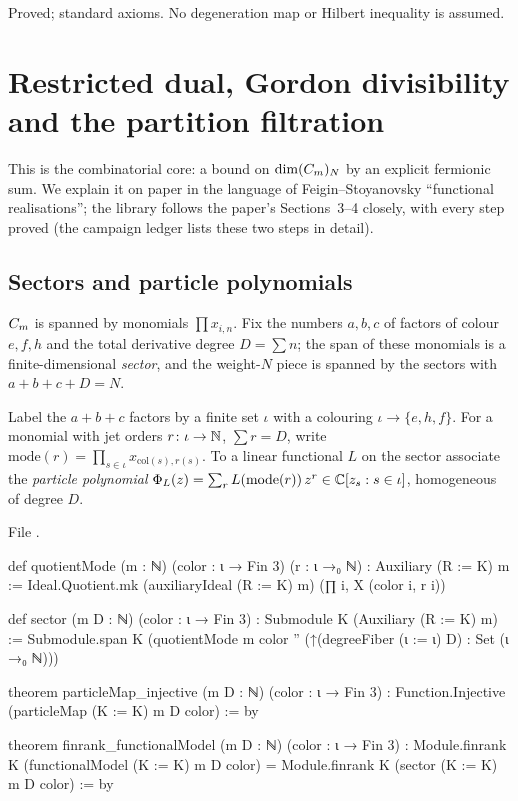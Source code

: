 \begin{status}
Proved; standard axioms. No degeneration map or Hilbert inequality is assumed.
\end{status}

\section{Restricted dual, Gordon divisibility and the partition filtration}\label{l20:sec:m23}

This is the combinatorial core: a bound on $\dim(C_m)_N$ by an explicit fermionic sum. We explain it on
paper in the language of Feigin--Stoyanovsky ``functional realisations''; the library follows the paper's
Sections~3--4 closely, with every step proved (the campaign ledger lists these two steps in detail).

\subsection{Sectors and particle polynomials}

$C_m$ is spanned by monomials $\prod x_{i,n}$. Fix the numbers $a,b,c$ of factors of colour $e,f,h$ and the
total derivative degree $D=\sum n$; the span of these monomials is a finite-dimensional \emph{sector}, and the
weight-$N$ piece is spanned by the sectors with $a+b+c+D=N$.

\begin{definition}\label{l20:def:sector}
Label the $a+b+c$ factors by a finite set $\iota$ with a colouring $\iota\to\{e,h,f\}$. For a monomial with jet
orders $r\colon\iota\to{\mathbb{N}}$, $\sum r=D$, write $\mathrm{mode}(r)=\prod_{s\in\iota}x_{\mathrm{col}(s),r(s)}$. To a linear
functional $L$ on the sector associate the \emph{particle polynomial}
$\Phi_L(z)=\sum_{r}L(\mathrm{mode}(r))\,z^r\in{\mathbb{C}}[z_s:s\in\iota]$, homogeneous of degree $D$.
\end{definition}
\noindent File .
\begin{leancode}
def quotientMode (m : ℕ) (color : ι → Fin 3) (r : ι →₀ ℕ) : Auxiliary (R := K) m :=
  Ideal.Quotient.mk (auxiliaryIdeal (R := K) m) (∏ i, X (color i, r i))

def sector (m D : ℕ) (color : ι → Fin 3) : Submodule K (Auxiliary (R := K) m) :=
  Submodule.span K (quotientMode m color '' (↑(degreeFiber (ι := ι) D) : Set (ι →₀ ℕ)))

theorem particleMap_injective (m D : ℕ) (color : ι → Fin 3) :
    Function.Injective (particleMap (K := K) m D color) := by

theorem finrank_functionalModel (m D : ℕ) (color : ι → Fin 3) :
    Module.finrank K (functionalModel (K := K) m D color) =
      Module.finrank K (sector (K := K) m D color) := by
\end{leancode}

